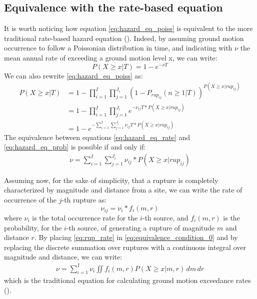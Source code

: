 \subsection{Equivalence with the rate-based equation}
It is worth noticing how equation \ref{eq:hazard_eq_poiss} is equivalent to the more traditional rate-based
hazard equation (\cite{mcguire1995}). Indeed, by assuming ground motion occurrence to follow a Poissonian
distribution in time, and indicating with $\nu$ the mean annual rate of exceeding a ground motion level x,
we can write:
\begin{equation}
\label{eq:hazard_eq_rate}
P(X \ge x | T) = 1 - e ^ {- \nu T}
\end{equation}
We can also rewrite \ref{eq:hazard_eq_poiss} as:
\begin{align}
\label{eq:hazard_eq_prob}
P(X \ge x | T) &= 1 - \prod_{i=1}^{I} \prod_{j=1}^{J_{i}} (1 - P_{rup_{ij}}(n \ge 1 | T))^{P(X \ge x | rup_{ij})} \nonumber \\
		      &= 1 - \prod_{i=1}^{I} \prod_{j=1}^{J_{i}} e^{-\nu_{ij} T * P(X \ge x | rup_{ij})} \nonumber \\
		      & = 1 - e ^ {- \sum_{i=1}^{I} \sum_{j=1}^{J_{i}} \nu_{ij} T * P(X \ge x | rup_{ij})}
\end{align}
The equivalence between equations \ref{eq:hazard_eq_rate} and \ref{eq:hazard_eq_prob} is possible if and only if:
\begin{align}
\label{eq:equivalence_condition_0}
\nu  =  \sum_{i=1}^{I} \sum_{j=1}^{J_{i}} \nu_{ij} * P(X \ge x | rup_{ij})
\end{align}

Assuming now, for the sake of simplicity, that a rupture is completely characterized by magnitude and distance from a site, we
can write the rate of occurrence of the $j$-th rupture as:
\begin{equation}
\label{eq:rup_rate}
\nu_{ij} = \nu_{i} * f_{i}(m, r)
\end{equation}
where $\nu_{i}$ is the total occurrence rate for the $i$-th source, and $f_{i}(m, r)$ is the probability, for the $i$-th source, of
generating a rupture of magnitude $m$ and distance $r$. By placing \ref{eq:rup_rate} in \ref{eq:equivalence_condition_0} and
by replacing the discrete summation over ruptures with a continuous integral over magnitude and distance, we can write:
\begin{align}
\nu = \sum_{i=1}^{I} \nu_{i} \iint f_{i}(m, r) P(X \ge x | m, r)\,dm \,dr
\end{align}
which is the traditional equation for calculating ground motion exceedance rates (\cite{mcguire1995}).

